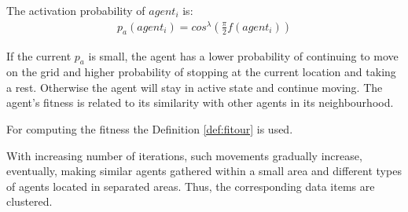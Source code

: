 \begin{definition}
The activation probability of $agent_{i}$ is:
\begin{align} 
p_a(agent_i)=cos^\lambda (\frac{\pi}{2}f(agent_i))
\end{align}
\end{definition}

\begin{remark}
If the current $p_a$ is small, the agent has a lower probability of continuing to move on the grid and higher probability of stopping at the current location and taking a rest. Otherwise the agent will stay in active state and continue moving. The agent's fitness is related to its similarity with other agents in its neighbourhood. 
\end{remark}

\begin{remark}
For computing the fitness the Definition \ref{def:fitour} is used.
\end{remark}

With increasing number of iterations, such movements gradually increase, eventually, making similar agents gathered within a small area and different types of agents located in separated areas. Thus, the corresponding data items are clustered.

	
